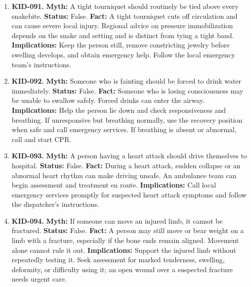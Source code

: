 \documentclass[11pt,oneside]{book}
\begin{document}
\begin{enumerate}[leftmargin=0pt,labelwidth=0pt,labelsep=0pt,itemindent=0pt]
\item[] \textbf{KID-091.} \textbf{Myth:} A tight tourniquet should routinely be tied above every snakebite.\newline
\textbf{Status:} False.\newline
\textbf{Fact:} A tight tourniquet cuts off circulation and can cause severe local injury. Regional advice on pressure immobilization depends on the snake and setting and is distinct from tying a tight band. \cite{ref269,ref371}\newline
\textbf{Implications:} Keep the person still, remove constricting jewelry before swelling develops, and obtain emergency help. Follow the local emergency team's instructions.
\item[] \textbf{KID-092.} \textbf{Myth:} Someone who is fainting should be forced to drink water immediately.\newline
\textbf{Status:} False.\newline
\textbf{Fact:} Someone who is losing consciousness may be unable to swallow safely. Forced drinks can enter the airway. \cite{ref372}\newline
\textbf{Implications:} Help the person lie down and check responsiveness and breathing. If unresponsive but breathing normally, use the recovery position when safe and call emergency services. If breathing is absent or abnormal, call and start CPR.
\item[] \textbf{KID-093.} \textbf{Myth:} A person having a heart attack should drive themselves to hospital.\newline
\textbf{Status:} False.\newline
\textbf{Fact:} During a heart attack, sudden collapse or an abnormal heart rhythm can make driving unsafe. An ambulance team can begin assessment and treatment en route. \cite{ref362}\newline
\textbf{Implications:} Call local emergency services promptly for suspected heart attack symptoms and follow the dispatcher's instructions.
\item[] \textbf{KID-094.} \textbf{Myth:} If someone can move an injured limb, it cannot be fractured.\newline
\textbf{Status:} False.\newline
\textbf{Fact:} A person may still move or bear weight on a limb with a fracture, especially if the bone ends remain aligned. Movement alone cannot rule it out. \cite{ref200}\newline
\textbf{Implications:} Support the injured limb without repeatedly testing it. Seek assessment for marked tenderness, swelling, deformity, or difficulty using it; an open wound over a suspected fracture needs urgent care.

\end{enumerate}
\end{document}
